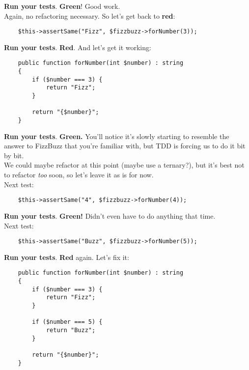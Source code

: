 \textbf{Run your tests}. \textbf{Green}! Good work.
\\

Again, no refactoring necessary. So let's get back to \textbf{red}:

\begin{verbatim}
    $this->assertSame("Fizz", $fizzbuzz->forNumber(3));
\end{verbatim}

\textbf{Run your tests}. \textbf{Red}. And let's get it working:

\begin{verbatim}
    public function forNumber(int $number) : string
    {
        if ($number === 3) {
            return "Fizz";
        }

        return "{$number}";
    }
\end{verbatim}

\textbf{Run your tests}. \textbf{Green.} You'll notice it's slowly starting to resemble the answer to FizzBuzz that you're familiar with, but TDD is forcing us to do it bit by bit.
\\

We could maybe refactor at this point (maybe use a ternary?), but it's best not to refactor \textit{too} soon, so let's leave it as is for now.
\\

Next test:

\begin{verbatim}
    $this->assertSame("4", $fizzbuzz->forNumber(4));
\end{verbatim}

\textbf{Run your tests}. \textbf{Green!} Didn't even have to do anything that time.
\\

Next test:

\begin{verbatim}
    $this->assertSame("Buzz", $fizzbuzz->forNumber(5));
\end{verbatim}

\textbf{Run your tests}. \textbf{Red} again. Let's fix it:

\begin{verbatim}
    public function forNumber(int $number) : string
    {
        if ($number === 3) {
            return "Fizz";
        }

        if ($number === 5) {
            return "Buzz";
        }

        return "{$number}";
    }
\end{verbatim}

